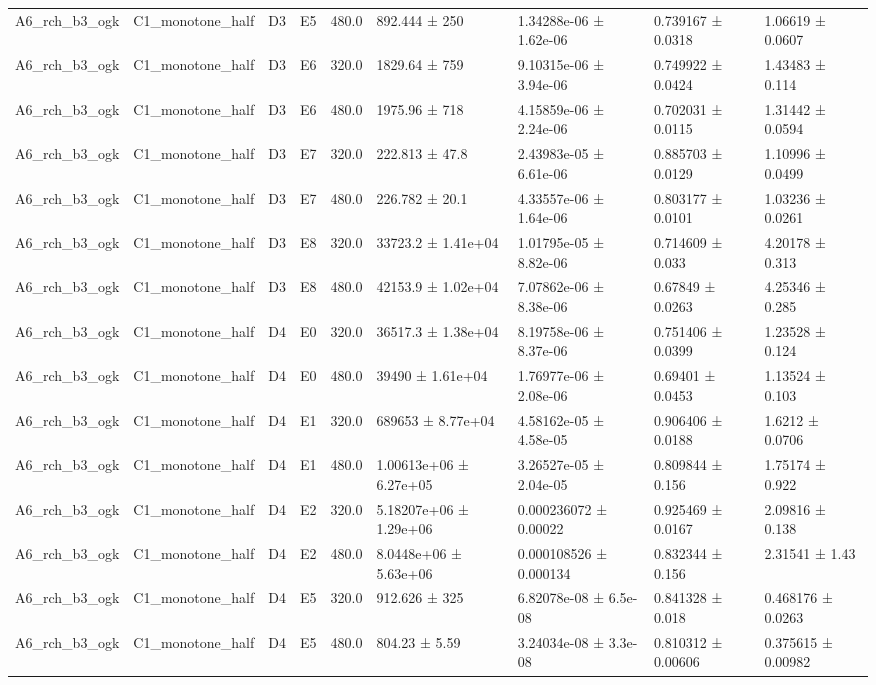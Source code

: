 \begin{table}
\begin{tabular}{lllllllll}
A6\_rch\_b3\_ogk & C1\_monotone\_half & D3 & E5 & 480.0 & 892.444 ± 250 & 1.34288e-06 ± 1.62e-06 & 0.739167 ± 0.0318 & 1.06619 ± 0.0607 \\
A6\_rch\_b3\_ogk & C1\_monotone\_half & D3 & E6 & 320.0 & 1829.64 ± 759 & 9.10315e-06 ± 3.94e-06 & 0.749922 ± 0.0424 & 1.43483 ± 0.114 \\
A6\_rch\_b3\_ogk & C1\_monotone\_half & D3 & E6 & 480.0 & 1975.96 ± 718 & 4.15859e-06 ± 2.24e-06 & 0.702031 ± 0.0115 & 1.31442 ± 0.0594 \\
A6\_rch\_b3\_ogk & C1\_monotone\_half & D3 & E7 & 320.0 & 222.813 ± 47.8 & 2.43983e-05 ± 6.61e-06 & 0.885703 ± 0.0129 & 1.10996 ± 0.0499 \\
A6\_rch\_b3\_ogk & C1\_monotone\_half & D3 & E7 & 480.0 & 226.782 ± 20.1 & 4.33557e-06 ± 1.64e-06 & 0.803177 ± 0.0101 & 1.03236 ± 0.0261 \\
A6\_rch\_b3\_ogk & C1\_monotone\_half & D3 & E8 & 320.0 & 33723.2 ± 1.41e+04 & 1.01795e-05 ± 8.82e-06 & 0.714609 ± 0.033 & 4.20178 ± 0.313 \\
A6\_rch\_b3\_ogk & C1\_monotone\_half & D3 & E8 & 480.0 & 42153.9 ± 1.02e+04 & 7.07862e-06 ± 8.38e-06 & 0.67849 ± 0.0263 & 4.25346 ± 0.285 \\
A6\_rch\_b3\_ogk & C1\_monotone\_half & D4 & E0 & 320.0 & 36517.3 ± 1.38e+04 & 8.19758e-06 ± 8.37e-06 & 0.751406 ± 0.0399 & 1.23528 ± 0.124 \\
A6\_rch\_b3\_ogk & C1\_monotone\_half & D4 & E0 & 480.0 & 39490 ± 1.61e+04 & 1.76977e-06 ± 2.08e-06 & 0.69401 ± 0.0453 & 1.13524 ± 0.103 \\
A6\_rch\_b3\_ogk & C1\_monotone\_half & D4 & E1 & 320.0 & 689653 ± 8.77e+04 & 4.58162e-05 ± 4.58e-05 & 0.906406 ± 0.0188 & 1.6212 ± 0.0706 \\
A6\_rch\_b3\_ogk & C1\_monotone\_half & D4 & E1 & 480.0 & 1.00613e+06 ± 6.27e+05 & 3.26527e-05 ± 2.04e-05 & 0.809844 ± 0.156 & 1.75174 ± 0.922 \\
A6\_rch\_b3\_ogk & C1\_monotone\_half & D4 & E2 & 320.0 & 5.18207e+06 ± 1.29e+06 & 0.000236072 ± 0.00022 & 0.925469 ± 0.0167 & 2.09816 ± 0.138 \\
A6\_rch\_b3\_ogk & C1\_monotone\_half & D4 & E2 & 480.0 & 8.0448e+06 ± 5.63e+06 & 0.000108526 ± 0.000134 & 0.832344 ± 0.156 & 2.31541 ± 1.43 \\
A6\_rch\_b3\_ogk & C1\_monotone\_half & D4 & E5 & 320.0 & 912.626 ± 325 & 6.82078e-08 ± 6.5e-08 & 0.841328 ± 0.018 & 0.468176 ± 0.0263 \\
A6\_rch\_b3\_ogk & C1\_monotone\_half & D4 & E5 & 480.0 & 804.23 ± 5.59 & 3.24034e-08 ± 3.3e-08 & 0.810312 ± 0.00606 & 0.375615 ± 0.00982 \\

\end{tabular}
\end{table}
